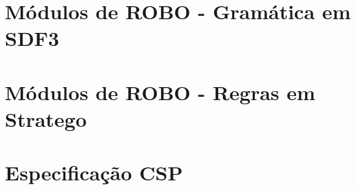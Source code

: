 \appendix

\chapter{Módulos de ROBO - Gramática em SDF3}
\label{apendice1}






\chapter{Módulos de ROBO - Regras em Stratego}
\label{apendice2}
\chapter{Especificação CSP}
\label{apendice2}

